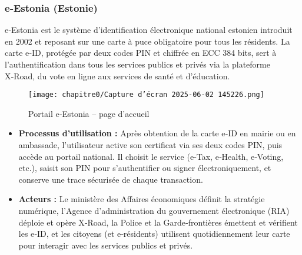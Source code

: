 \subsubsection{e‑Estonia (Estonie)}
e‑Estonia\cite{b2,b25} est le système d’identification électronique national estonien introduit en 2002 et reposant sur une carte à puce obligatoire pour tous les résidents\cite{b26}. La carte e‑ID, protégée par deux codes PIN et chiffrée en ECC 384 bits, sert à l’authentification dans tous les services publics et privés via la plateforme X‑Road\cite{b27}, du vote en ligne aux services de santé et d’éducation\cite{b26}.\\
\begin{figure}[H]
  \centering
  \texttt{[image: chapitre0/Capture d'écran 2025-06-02 145226.png]}
  \caption{Portail e‑Estonia – page d’accueil}
\end{figure}
\begin{itemize}[label=\textbullet]
  \item \textbf{Processus d'utilisation :} Après obtention de la carte e‑ID en mairie ou en ambassade, l’utilisateur active son certificat via ses deux codes PIN\cite{b28}, puis accède au portail national. Il choisit le service (e‑Tax, e‑Health, e‑Voting, etc.), saisit son PIN pour s’authentifier ou signer électroniquement, et conserve une trace sécurisée de chaque transaction\cite{b28}.
  \item \textbf{Acteurs :} Le ministère des Affaires économiques définit la stratégie numérique\cite{b29}, l’Agence d’administration du gouvernement électronique (RIA) déploie et opère X‑Road\cite{b27}, la Police et la Garde‑frontières émettent et vérifient les e‑ID\cite{b27}, et les citoyens (et e‑résidents) utilisent quotidiennement leur carte pour interagir avec les services publics et privés\cite{b26}.
\end{itemize}

